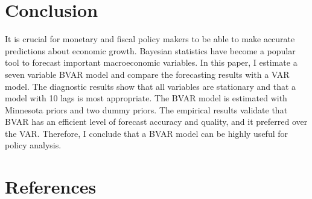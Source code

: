 \documentclass[11pt,preprint, authoryear]{elsarticle}
\numberwithin{equation}{section}
\numberwithin{figure}{section}
\numberwithin{table}{section}
\begin{document}
\hypertarget{conclusion}{%
\section{Conclusion}\label{conclusion}}

It is crucial for monetary and fiscal policy makers to be able to make
accurate predictions about economic growth. Bayesian statistics have
become a popular tool to forecast important macroeconomic variables. In
this paper, I estimate a seven variable BVAR model and compare the
forecasting results with a VAR model. The diagnostic results show that
all variables are stationary and that a model with 10 lags is most
appropriate. The BVAR model is estimated with Minnesota priors and two
dummy priors. The empirical results validate that BVAR has an efficient
level of forecast accuracy and quality, and it preferred over the VAR.
Therefore, I conclude that a BVAR model can be highly useful for policy
analysis.

\newpage

\hypertarget{references}{%
\section*{References}\label{references}}
\end{document}
